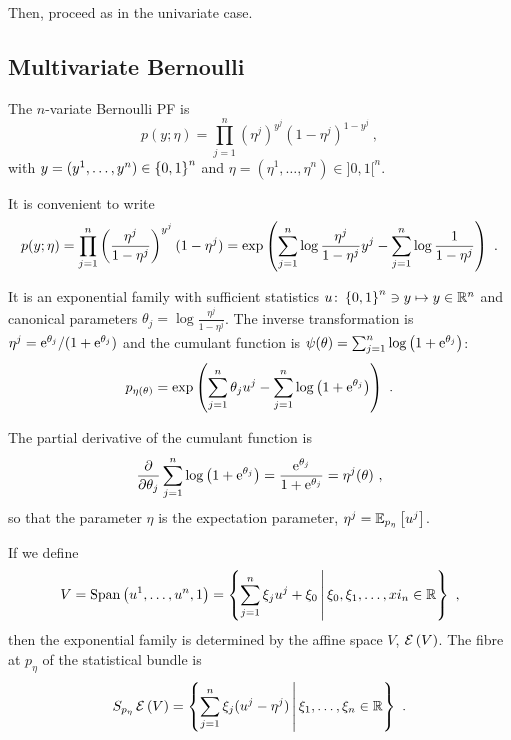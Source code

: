 \documentclass[12pt,a4paper]{amsart}
\begin{document}
Then, proceed as in the univariate case.

\subsection{Multivariate Bernoulli}
\label{sec:mult-binom}

The $n$-variate Bernoulli PF is 
\begin{equation}
    p(y;\eta) = \prod_{j=1}^n (\eta^j)^{y^j}(1-\eta^j)^{1-y^j} \ , 
\end{equation}
with $y = (y^1,\dots,y^n) \in \left\{0,1\right\}^n$ and $\eta = (\eta^1,\dots,\eta^n) \in ]0,1[^n$.

It is convenient to write
\begin{equation}
    p(y;\eta) = \prod_{j=1}^n \left(\frac{\eta^j}{1-\eta^j}\right)^{y^j} (1 - \eta^j) = \exp\left(\sum_{j=1}^n \log \frac{\eta^j}{1-\eta^j} y^j - \sum_{j=1}^n \log \frac 1 {1 - \eta^j}\right) \ .
  \end{equation}

  It is an exponential family with sufficient statistics $u \colon \left\{0,1\right\}^n \ni y \mapsto y \in \mathbb{R}^n$ and canonical parameters $\theta_j = \log \frac{\eta^j}{1-\eta^j}$. The inverse transformation is $\eta^j = \mathrm{e}^{\theta_j}/(1+\mathrm{e}^{\theta_j})$ and the cumulant function is $\psi(\theta) = \sum_{j=1}^n \log \left(1 + \mathrm{e}^{\theta_j}\right)$:
      \begin{equation}
        \label{eq:21}
        p_{\eta(\theta)} = \exp\left(\sum_{j=1}^n \theta_j u^j - \sum_{j=1}^n \log \left(1 + \mathrm{e}^{\theta_j}\right)\right) \ .
      \end{equation}

 The partial derivative of the cumulant function is
      \begin{equation}
        \label{eq:26}
        \frac {\partial} {\partial \theta_j} \sum_{j=1}^n \log \left(1 + \mathrm{e}^{\theta_j}\right) = \frac{\mathrm{e}^{\theta_j}}{1 + \mathrm{e}^{\theta_j}} = \eta^j(\theta) \ , \end{equation}
      so that the parameter $\eta$ is the expectation parameter, $\eta^j = \operatorname{\mathbb E}_{p_\eta}\left[u^j\right]$.

If we define
\begin{equation}
  \label{eq:27}
  V = \operatorname{Span}\left(u^1,\dots,u^n,1\right) = \left\{\sum_{j=1}^n \xi_j u^j + \xi_0 \, \middle| \, \xi_0,\xi_1, \dots,xi_n \in \mathbb{R} \right\} \ ,
\end{equation}
then the exponential family is determined by the affine space $V$, $\operatorname{\mathcal E}\left(V\right)$. The fibre at $p_\eta$ of the statistical bundle is
\begin{equation}
  \label{eq:28}
  S_{p_\eta}\operatorname{\mathcal E}\left(V\right) = \left\{\sum_{j=1}^n \xi_j(u^j - \eta^j) \, \middle| \, \xi_1,\dots,\xi_n \in \mathbb{R} \right\} \ .
\end{equation}
\end{document}
